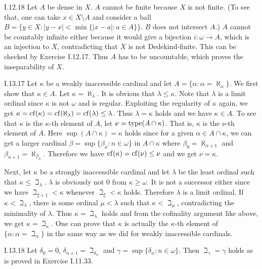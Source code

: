 \documentclass[12pt]{article}
\begin{document}
\begin{customthm}{I.12.18}
  Let $A$ be dense in $X$. $A$ cannot be finite because $X$ is not finite. (To see that, one can take $x\in X\setminus A$ and consider a ball $B=\{y\in X: |y-x|<\min\{|x-a|:a\in A\}\}$. $B$ does not intersect $A$.) $A$ cannot be countably infinite either because it would give a bijection $i:\omega\rightarrow A$, which is an injection to $X$, contradicting that $X$ is not Dedekind-finite. This can be checked by Exercise I.12.17. Thus $A$ has to be uncountable, which proves the inseparability of $X$.
\end{customthm}

\begin{customthm}{I.13.17}
  Let $\kappa$ be a weakly inaccessible cardinal and let $A=\{\alpha:\alpha=\aleph_\alpha\}$. We first show that $\kappa\in A$. Let $\kappa=\aleph_\lambda$. It is obvious that $\lambda\leq\kappa$. Note that $\lambda$ is a limit ordinal since $\kappa$ is not $\omega$ and is regular. Exploiting the regularity of $\kappa$ again, we get $\kappa=\mathop{\mathrm{cf}}(\kappa)=\mathop{\mathrm{cf}}(\aleph_\lambda)=\mathop{\mathrm{cf}}(\lambda)\leq\lambda$. Thus $\lambda=\kappa$ holds and we have $\kappa\in A$. To see that $\kappa$ is the $\kappa$-th element of $A$, let $\nu=\mathop{\mathrm{type}}(A\cap\kappa)$. That is, $\kappa$ is the $\nu$-th element of $A$. Here $\sup(A\cap\kappa)=\kappa$ holds since for a given $\alpha\in A\cap\kappa$, we can get a larger cardinal $\beta=\sup\{\beta_n:n\in\omega\}$ in $A\cap\kappa$ where $\beta_0=\aleph_{\alpha+1}$ and $\beta_{n+1}=\aleph_{\beta_n}$. Therefore we have $\mathop{\mathrm{cf}}(\kappa)=\mathop{\mathrm{cf}}(\nu)\leq\nu$ and we get $\nu=\kappa$.

  Next, let $\kappa$ be a strongly inaccessible cardinal and let $\lambda$ be the least ordinal such that $\kappa\leq\beth_\lambda$. $\lambda$ is obviously not $0$ from $\kappa\geq\omega$. It is not a successor either since we have $\beth_{\xi+1}<\kappa$ whenever $\beth_{\xi}<\kappa$ holds. Therefore $\lambda$ is a limit ordinal. If $\kappa<\beth_\lambda$, there is some ordinal $\mu<\lambda$ such that $\kappa<\beth_\mu$, contradicting the minimality of $\lambda$. Thus $\kappa=\beth_\lambda$ holds and from the cofinality argument like above, we get $\kappa=\beth_\kappa$. One can prove that $\kappa$ is actually the $\kappa$-th element of $\{\alpha:\alpha=\beth_\alpha\}$ in the same way as we did for weakly inaccessible cardinals.
\end{customthm}

\begin{customthm}{I.13.18}
  Let $\delta_0=0$, $\delta_{n+1}=\beth_{\delta_n}$ and $\gamma=\sup\{\delta_n:n\in\omega\}$. Then $\beth_\gamma=\gamma$ holds as is proved in Exercise I.11.33.
\end{customthm}
\end{document}
